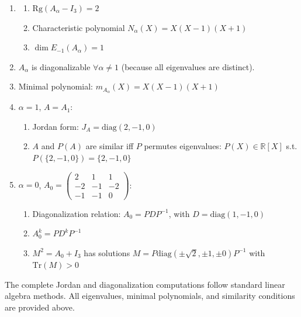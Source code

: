 \documentclass[12pt]{article}
\begin{document}
\begin{enumerate}
    \item \begin{enumerate}
        \item $\mathrm{Rg}(A_{\alpha} - I_3) = 2$ 
        \item Characteristic polynomial $N_\alpha(X) = X(X-1)(X+1)$
        \item $\dim E_{-1}(A_\alpha) = 1$
    \end{enumerate}
    
    \item $A_\alpha$ is diagonalizable $\forall \alpha\neq 1$ (because all eigenvalues are distinct).
    
    \item Minimal polynomial: $m_{A_\alpha}(X) = X(X-1)(X+1)$
    
    \item $\alpha = 1$, $A = A_1$:
    \begin{enumerate}
        \item Jordan form: $J_A = \text{diag}(2, -1, 0)$
        \item $A$ and $P(A)$ are similar iff $P$ permutes eigenvalues: $P(X) \in \mathbb{R}[X]$ s.t. $P(\{2,-1,0\}) = \{2,-1,0\}$
    \end{enumerate}
    
    \item $\alpha = 0$, $A_0 = \begin{pmatrix}2 & 1 & 1 \\ -2 & -1 & -2 \\ -1 & -1 & 0 \end{pmatrix}$:
    \begin{enumerate}
        \item Diagonalization relation: $A_0 = PDP^{-1}$, with $D = \text{diag}(1, -1, 0)$
        \item $A_0^k = P D^k P^{-1}$ 
        \item $M^2 = A_0 + I_3$ has solutions $M = P \text{diag}(\pm \sqrt{2}, \pm 1, \pm 0) P^{-1}$ with $\mathrm{Tr}(M) > 0$
    \end{enumerate}
\end{enumerate}

\begin{answerbox}
The complete Jordan and diagonalization computations follow standard linear algebra methods. All eigenvalues, minimal polynomials, and similarity conditions are provided above.
\end{answerbox}

\end{document}
